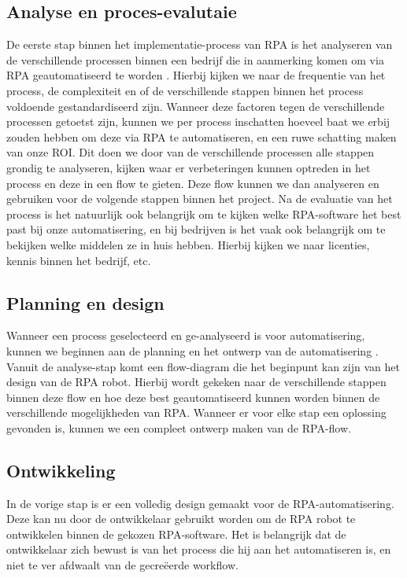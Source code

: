 \subsection{Analyse en proces-evalutaie}

De eerste stap binnen het implementatie-process van RPA is het analyseren van de verschillende processen binnen een bedrijf die in aanmerking komen om via RPA geautomatiseerd te worden \autocite{vanDerAalst2018}. Hierbij kijken we naar de frequentie van het process, de complexiteit en of de verschillende stappen binnen het process voldoende gestandardiseerd zijn. Wanneer deze factoren tegen de verschillende processen getoetst zijn, kunnen we per process inschatten hoeveel baat we erbij zouden hebben om deze via RPA te automatiseren, en een ruwe schatting maken van onze ROI. Dit doen we door van de verschillende processen alle stappen grondig te analyseren, kijken waar er verbeteringen kunnen optreden in het process en deze in een flow te gieten. Deze flow kunnen we dan analyseren en gebruiken voor de volgende stappen binnen het project.
Na de evaluatie van het process is het natuurlijk ook belangrijk om te kijken welke RPA-software het best past bij onze automatisering, en bij bedrijven is het vaak ook belangrijk om te bekijken welke middelen ze in huis hebben. Hierbij kijken we naar licenties, kennis binnen het bedrijf, etc.

\subsection{Planning en design}

Wanneer een process geselecteerd en ge-analyseerd is voor automatisering, kunnen we beginnen aan de planning en het ontwerp van de automatisering \autocite{Fernandez2021}. Vanuit de analyse-stap komt een flow-diagram die het beginpunt kan zijn van het design van de RPA robot. Hierbij wordt gekeken naar de verschillende stappen binnen deze flow en hoe deze best geautomatiseerd kunnen worden binnen de verschillende mogelijkheden van RPA. Wanneer er voor elke stap een oplossing gevonden is, kunnen we een compleet ontwerp maken van de RPA-flow.

\subsection{Ontwikkeling}

In de vorige stap is er een volledig design gemaakt voor de RPA-automatisering. Deze kan nu door de ontwikkelaar gebruikt worden om de RPA robot te ontwikkelen binnen de gekozen RPA-software. Het is belangrijk dat de ontwikkelaar zich bewust is van het process die hij aan het automatiseren is, en niet te ver afdwaalt van de gecreëerde workflow.

